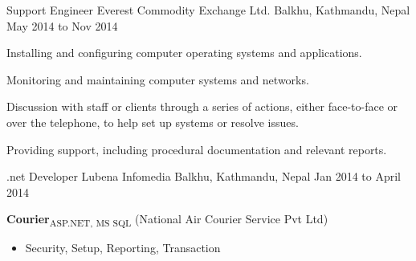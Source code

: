 \begin{cventries}
  \cventry
    {Support Engineer} %
    {Everest Commodity Exchange Ltd.} %
    {Balkhu, Kathmandu, Nepal} %
    {May 2014 to Nov 2014} %
    {
      \begin{cvitems} %
        \item {Installing and configuring computer operating systems and applications.}
        \item {Monitoring and maintaining computer systems and networks.}
        \item{Discussion with staff or clients through a series of actions, either face-to-face or over the telephone, to help set up systems or resolve issues.}
		\item{Providing support, including procedural documentation and relevant reports.}
      \end{cvitems} 
    }

  \cventry
    {.net Developer} %
    {Lubena Infomedia} %
    {Balkhu, Kathmandu, Nepal} %
    {Jan 2014 to April 2014} %
    {
      \begin{cvitems} %
        \item {\textbf{Courier}\textsubscript{ASP.NET, MS SQL} (National Air Courier Service Pvt Ltd)}
        \begin{itemize}
        \item {Security, Setup, Reporting, Transaction}
        \end{itemize}      
      \end{cvitems}
    }


\end{cventries}

